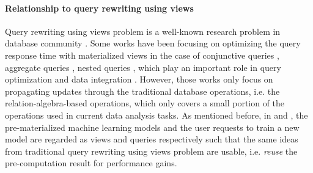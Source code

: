 \paragraph{Relationship to query rewriting using views} Query rewriting using views problem is a well-known research problem in database community \cite{halevy2001answering}. Some works have been focusing on optimizing the query response time with materialized views in the case of conjunctive queries \cite{chandra1977optimal, chaudhuri1995optimizing, pottinger2000scalable, afrati2007using}, aggregate queries \cite{cohen2007deciding, cohen1999rewriting, srivastava1996answering, galindo2001orthogonal}, nested queries \cite{zaharioudakis2000answering}, which play an important role in query optimization and data integration \cite{halevy2001answering}. However, those works only focus on propagating updates through the traditional database operations, i.e. the relation-algebra-based operations, which only covers a small portion of the operations used in current data analysis tasks. As mentioned before, in \cite{gupta2015processing} and \cite{hasani2018efficient}, the pre-materialized machine learning models and the user requests to train a new model are regarded as views and queries respectively such that the same ideas from traditional query rewriting using views problem are usable, i.e. {\em reuse} the pre-computation result for performance gains.

